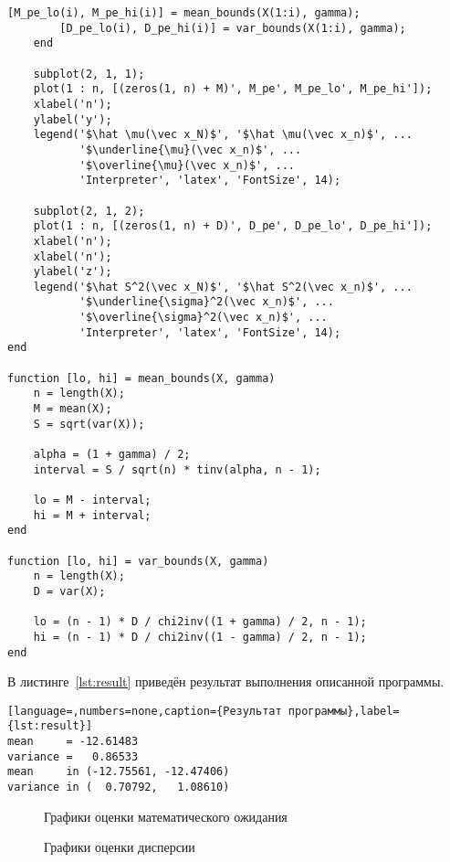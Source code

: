 \begin{lstlisting}[caption={Текст программы},label={lst:programm}]
        [M_pe_lo(i), M_pe_hi(i)] = mean_bounds(X(1:i), gamma);
        [D_pe_lo(i), D_pe_hi(i)] = var_bounds(X(1:i), gamma);
    end

    subplot(2, 1, 1);
    plot(1 : n, [(zeros(1, n) + M)', M_pe', M_pe_lo', M_pe_hi']);
    xlabel('n');
    ylabel('y');
    legend('$\hat \mu(\vec x_N)$', '$\hat \mu(\vec x_n)$', ...
           '$\underline{\mu}(\vec x_n)$', ...
           '$\overline{\mu}(\vec x_n)$', ...
           'Interpreter', 'latex', 'FontSize', 14);

    subplot(2, 1, 2);
    plot(1 : n, [(zeros(1, n) + D)', D_pe', D_pe_lo', D_pe_hi']);
    xlabel('n');
    xlabel('n');
    ylabel('z');
    legend('$\hat S^2(\vec x_N)$', '$\hat S^2(\vec x_n)$', ...
           '$\underline{\sigma}^2(\vec x_n)$', ...
           '$\overline{\sigma}^2(\vec x_n)$', ...
           'Interpreter', 'latex', 'FontSize', 14);
end

function [lo, hi] = mean_bounds(X, gamma)
    n = length(X);
    M = mean(X);
    S = sqrt(var(X));

    alpha = (1 + gamma) / 2;
    interval = S / sqrt(n) * tinv(alpha, n - 1);

    lo = M - interval;
    hi = M + interval;
end

function [lo, hi] = var_bounds(X, gamma)
    n = length(X);
    D = var(X);

    lo = (n - 1) * D / chi2inv((1 + gamma) / 2, n - 1);
    hi = (n - 1) * D / chi2inv((1 - gamma) / 2, n - 1);
end
\end{lstlisting}

В листинге~\ref{lst:result} приведён результат выполнения описанной программы.
\begin{lstlisting}[language=,numbers=none,caption={Результат программы},label={lst:result}]
mean     = -12.61483
variance =   0.86533
mean     in (-12.75561, -12.47406)
variance in (  0.70792,   1.08610)
\end{lstlisting}

\begin{figure}[H]
    \caption{Графики оценки математического ожидания}\label{img:plot01}

    
\end{figure}

\begin{figure}[H]
    \caption{Графики оценки дисперсии}\label{img:plot02}
    
\end{figure}

